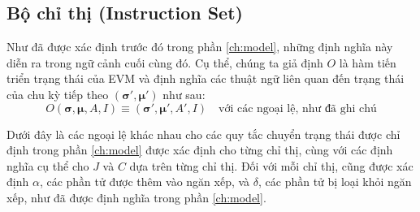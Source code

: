 \documentclass[9pt,oneside]{amsart}
\begin{document}
\subsection{Bộ chỉ thị (Instruction Set)}
\label{subsec:instruction-set}

Như đã được xác định trước đó trong phần \ref{ch:model}, những định nghĩa này diễn ra trong ngữ cảnh cuối cùng đó. Cụ thể, chúng ta giả định $O$ là hàm tiến triển trạng thái của EVM và định nghĩa các thuật ngữ liên quan đến trạng thái của chu kỳ tiếp theo $(\boldsymbol{\sigma}', \boldsymbol{\mu}')$ như sau:
\begin{equation}
O(\boldsymbol{\sigma}, \boldsymbol{\mu}, A, I) \equiv (\boldsymbol{\sigma}', \boldsymbol{\mu}', A', I) \quad \text{với các ngoại lệ, như đã ghi chú}
\end{equation}

Dưới đây là các ngoại lệ khác nhau cho các quy tắc chuyển trạng thái được chỉ định trong phần \ref{ch:model} được xác định cho từng chỉ thị, cùng với các định nghĩa cụ thể cho $J$ và $C$ dựa trên từng chỉ thị. Đối với mỗi chỉ thị, cũng được xác định $\alpha$, các phần tử được thêm vào ngăn xếp, và $\delta$, các phần tử bị loại khỏi ngăn xếp, như đã được định nghĩa trong phần \ref{ch:model}.
\end{document}
